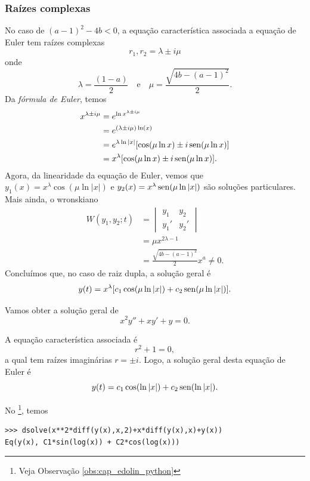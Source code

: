 \subsubsection{Raízes complexas}

No caso de $(a-1)^2-4b < 0$, a equação característica associada a equação de Euler tem raízes complexas
\begin{equation}
  r_1,r_2 = \lambda \pm i\mu
\end{equation}
onde
\begin{equation}
  \lambda = \frac{(1-a)}{2}\quad\text{e}\quad \mu = \frac{\sqrt{4b - (a-1)^2}}{2}.
\end{equation}
Da \emph{fórmula de Euler}, temos
\begin{align}
  x^{\lambda\pm i\mu} &= e^{\ln x^{\lambda \pm i\mu}} \\
                      &= e^{(\lambda \pm i\mu)\ln(x)} \\
                      &= e^{\lambda\ln|x|}[\cos(\mu\ln x) \pm i\operatorname{sen}(\mu\ln x)] \\
                      &= x^\lambda[\cos(\mu\ln x) \pm i\operatorname{sen}(\mu\ln x)].
\end{align}
Agora, da linearidade da equação de Euler, vemos que $y_1(x) = x^\lambda\cos(\mu\ln|x|)$ e $y_2(x) = x^\lambda\operatorname{sen}(\mu\ln|x|)$ são soluções particulares. Mais ainda, o wronskiano
\begin{align}
  W(y_1,y_2;t) &=
                 \begin{vmatrix}
                   y_1 & y_2 \\
                   y_1' & y_2'
                 \end{vmatrix} \\
               &= \mu x^{2\lambda-1} \\
               &= \frac{\sqrt{4b-(a-1)^2}}{2}x^a \neq 0.
\end{align}
Concluímos que, no caso de raiz dupla, a solução geral é
\begin{equation}
  y(t) = x^\lambda[c_1\cos(\mu\ln|x|) + c_2\operatorname{sen}(\mu\ln|x|)].
\end{equation}

\begin{ex}
  Vamos obter a solução geral de
  \begin{equation}
    x^2y'' + xy' + y = 0.
  \end{equation}

  A equação característica associada é
  \begin{equation}
    r^2 + 1 = 0,
  \end{equation}
  a qual tem raízes imaginárias $r = \pm i$. Logo, a solução geral desta equação de Euler é
  \begin{equation}
    y(t) = c_1\cos(\ln|x|) + c_2\operatorname{sen}(\ln|x|).
  \end{equation}

  \ifispython
  No \python\footnote{Veja Observação \ref{obs:cap_edolin_python}}, temos
\begin{verbatim}
>>> dsolve(x**2*diff(y(x),x,2)+x*diff(y(x),x)+y(x))
Eq(y(x), C1*sin(log(x)) + C2*cos(log(x)))
\end{verbatim}
  \fi    
\end{ex}

